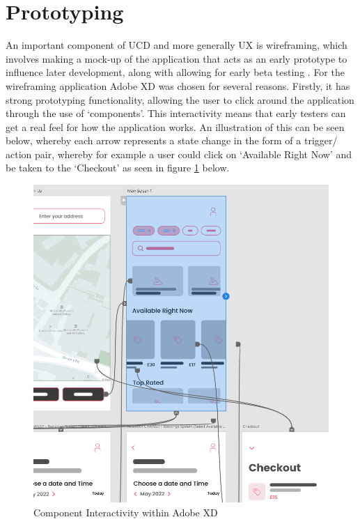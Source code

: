 \documentclass[12pt]{article}
\begin{document}
	\section{Prototyping}
	An important component of UCD and more generally UX is wireframing, which involves making a mock-up of the application that acts as an early prototype to influence later development, along with allowing for early beta testing \cite{Arnowitz Arent Berger}. For the wireframing application Adobe XD was chosen for several reasons. Firstly, it has strong prototyping functionality, allowing the user to click around the application through the use of ‘components’. This interactivity means that early testers can get a real feel for how the application works. An illustration of this can be seen below, whereby each arrow represents a state change in the form of a trigger/ action pair, whereby for example a user could click on ‘Available Right Now’ and be taken to the ‘Checkout’ as seen in figure \ref{fig:prot-comp} below.
	\begin{figure}[H]
		\centering
		\includegraphics[scale=0.5]{images/prototyping-components.png}
		\caption{Component Interactivity within Adobe XD}
		\label{fig:prot-comp}
	\end{figure}
	
\end{document}
